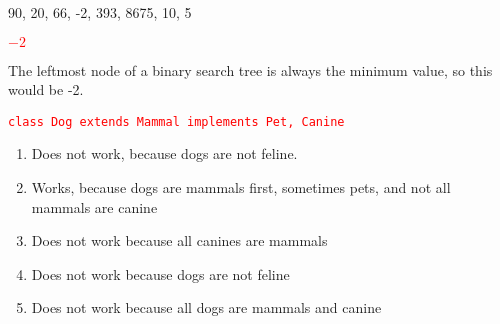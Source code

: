 \documentclass[11pt,addpoints]{exam}
\begin{document}
\begin{questions}
\begin{minipage}{\textwidth}
\end{minipage}

\begin{minipage}{\textwidth}

90, 20, 66, -2, 393, 8675, 10, 5 \\

\begin{choices}
  \choice \textcolor{red}{$-2$}
   \\
\end{choices}

The leftmost node of a binary search tree is always the minimum value, so this would be -2. \\

\end{minipage}


\begin{minipage}{\textwidth}

\begin{choices}
  \choice \textcolor{red}{\tt class Dog extends Mammal implements Pet, Canine}
   \\
\end{choices}

\begin{enumerate}[label=\Alph*]
  \item Does not work, because dogs are not feline.
  \item Works, because dogs are mammals first, sometimes pets, and not all mammals are canine
  \item Does not work because all canines are mammals
  \item Does not work because dogs are not feline
  \item Does not work because all dogs are mammals and canine
\end{enumerate}


\end{minipage}
\end{questions}
\end{document}
